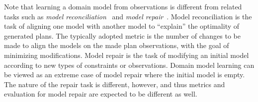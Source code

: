 \documentclass{article}
\theoremstyle{definition}
\theoremstyle{remark}
\newif\ifaddcomments
\newcommand{\roni}[1]{\ifaddcomments{\textcolor{red}{[Roni: #1]}}\fi}
\newcommand{\yarin}[1]{\ifaddcomments{\textcolor{teal}{[Yarin: #1]}}\fi}
\newcommand{\leo}[1]{\ifaddcomments{\textcolor{pink}{[Leonardo: #1]}}\fi}
\begin{document}
Note that learning a domain model from observations is different from related tasks such as \emph{model reconciliation}~\citep[inter alia]{ChakrabortiSZK17,SreedharanHMK19}\yarin{what is inter alia ?} and \emph{model repair}~\citep{bercher2025aSurvey}. 
Model reconciliation is the task of aligning one model with another model to ``explain'' the optimality of generated plans. 
The typically adopted metric is 
the number of changes to be made to align the models on the made plan observations, with the goal of minimizing modifications.
Model repair is the task of modifying an initial model according to new types of constraints or observations. Domain model learning can be viewed as an extreme case of model repair where the initial model is empty\yarin{, but, the objectives differ. Therefore, assessing model repair requires evaluation measures specifically designed to capture its unique objectives and constraints.}. The nature of the repair task is different, however, and thus metrics and evaluation for model repair are expected to be different as well. 
\roni{I'm not super happy with my last 2 sentences.}  
\leo{maybe there is some relation between model repair and model learning from an input (possibly flawed) model?}






\end{document}
